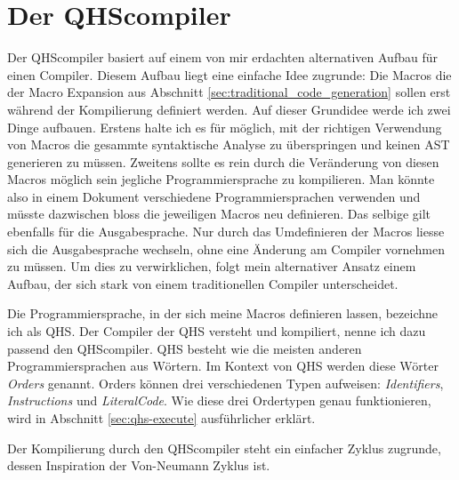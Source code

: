 \chapter{Der QHScompiler} \label{cha:4-QHS_Compiler}
Der QHScompiler basiert auf einem von mir erdachten alternativen Aufbau für einen Compiler. Diesem Aufbau liegt eine einfache Idee zugrunde:
Die Macros die der Macro Expansion aus Abschnitt \ref{sec:traditional_code_generation} sollen erst während der Kompilierung definiert werden. 
Auf dieser Grundidee werde ich zwei Dinge aufbauen. Erstens halte ich es für möglich, mit der richtigen Verwendung von Macros die gesammte syntaktische Analyse zu überspringen und keinen AST generieren zu müssen.
Zweitens sollte es rein durch die Veränderung von diesen Macros möglich sein jegliche Programmiersprache zu kompilieren. Man könnte also in einem Dokument verschiedene Programmiersprachen verwenden und
müsste dazwischen bloss die jeweiligen Macros neu definieren. Das selbige gilt ebenfalls für die Ausgabesprache.
Nur durch das Umdefinieren der Macros liesse sich die Ausgabesprache wechseln, ohne eine Änderung am Compiler vornehmen zu müssen.
Um dies zu verwirklichen, folgt mein alternativer Ansatz einem Aufbau, der sich stark von einem traditionellen Compiler unterscheidet.

Die Programmiersprache, in der sich meine Macros definieren lassen, bezeichne ich als QHS. Der Compiler der QHS versteht und kompiliert, nenne ich dazu passend den QHScompiler.
QHS besteht wie die meisten anderen Programmiersprachen aus Wörtern. Im Kontext von QHS werden diese Wörter \textit{Orders} genannt.
Orders können drei verschiedenen Typen aufweisen: \textit{Identifiers}, \textit{Instructions} und \textit{LiteralCode}.
Wie diese drei Ordertypen genau funktionieren, wird in Abschnitt \ref{sec:qhs-execute} ausführlicher erklärt.

Der Kompilierung durch den QHScompiler steht ein einfacher Zyklus zugrunde, dessen Inspiration der Von-Neumann Zyklus ist.

